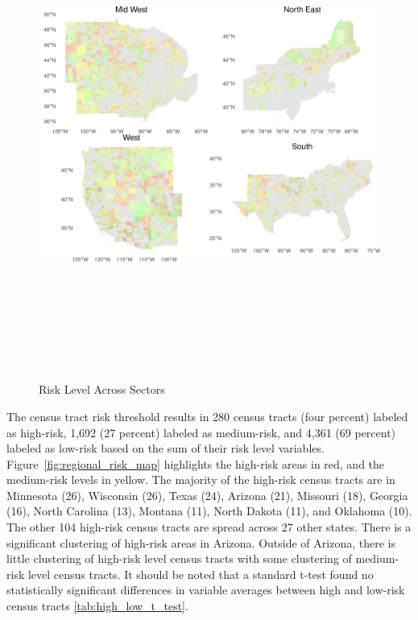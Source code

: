 \begin{figure}[htbp]
    \centering
     \includegraphics[width=\textwidth, height=16cm]{plots/regional_map.png}
     \caption{Risk Level Across Sectors}
     \label{fig:regional_map}
 \end{figure}


 \FloatBarrier
 The census tract risk threshold results in 280 census tracts (four percent) labeled as high-risk, 1,692 (27 percent) labeled as medium-risk, and 4,361 (69 percent) labeled as low-risk based on the sum of their risk level variables. Figure~\ref{fig:regional_risk_map} highlights the high-risk areas in red, and the medium-risk levels in yellow. The majority of the high-risk census tracts are in Minnesota (26), Wisconsin (26), Texas (24), Arizona (21), Missouri (18), Georgia (16), North Carolina (13), Montana (11), North Dakota (11), and Oklahoma (10). The other 104 high-risk census tracts are spread across 27 other states. There is a significant clustering of high-risk areas in Arizona. Outside of Arizona, there is little clustering of high-risk level census tracts with some clustering of medium-risk level census tracts. It should be noted that a standard t-test found no statistically significant differences in variable averages between high and low-risk census tracts \ref{tab:high_low_t_test}.

